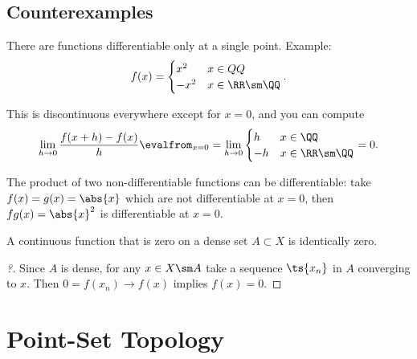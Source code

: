 \hypertarget{counterexamples}{%
\subsection{Counterexamples}\label{counterexamples}}

\begin{proposition}[?]

There are functions differentiable only at a single point. Example:
\begin{align*}  
f(x) = 
\begin{cases}
x^2 & x\in QQ\\
-x^2 & x\in \RR\sm\QQ
\end{cases}
.\end{align*}

This is discontinuous everywhere except for \(x=0\), and you can compute
\begin{align*}  
\lim_{h\to 0} {f(x+h) - f(x) \over h}\evalfrom_{x=0} = 
\lim_{h\to 0}
\begin{cases}
h & x\in \QQ \\
-h & x\in \RR\sm\QQ 
\end{cases}
=0
.\end{align*}

\end{proposition}

\begin{proposition}[?]

The product of two non-differentiable functions can be differentiable:
take \(f(x) = g(x) = \abs{x}\) which are not differentiable at \(x=0\),
then \(fg(x) = \abs{x}^2\) is differentiable at \(x=0\).

\end{proposition}

\begin{proposition}[?]

A continuous function that is zero on a dense set \(A\subset X\) is
identically zero.

\begin{proof}[?]

Since \(A\) is dense, for any \(x\in X\sm A\) take a sequence
\(\ts{x_n}\) in \(A\) converging to \(x\). Then \(0 = f(x_n) \to f(x)\)
implies \(f(x) = 0\).

\end{proof}

\end{proposition}

\hypertarget{point-set-topology}{%
\section{Point-Set Topology}\label{point-set-topology}}

